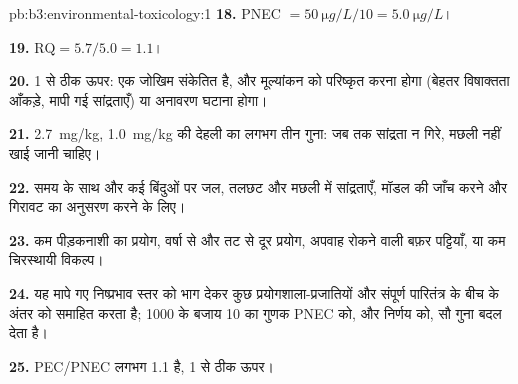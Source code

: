 \begin{solution}{pb:b3:environmental-toxicology:1}
\textbf{18.} PNEC $= \qty{50}{\micro g/L}/10 = \qty{5.0}{\micro g/L}$।

\textbf{19.} $\mathrm{RQ} = 5.7/5.0 = 1.1$।

\textbf{20.} 1 से ठीक ऊपर: एक जोखिम संकेतित है, और मूल्यांकन को परिष्कृत करना होगा (बेहतर
विषाक्तता आँकड़े, मापी गई सांद्रताएँ) या अनावरण घटाना होगा।

\textbf{21.} \qty{2.7}{mg/kg}, \qty{1.0}{mg/kg} की देहली का लगभग तीन गुना: जब तक सांद्रता न गिरे,
मछली नहीं खाई जानी चाहिए।

\textbf{22.} समय के साथ और कई बिंदुओं पर जल, तलछट और मछली में सांद्रताएँ,
मॉडल की जाँच करने और गिरावट का अनुसरण करने के लिए।

\textbf{23.} कम पीड़कनाशी का प्रयोग, वर्षा से और तट से दूर प्रयोग,
अपवाह रोकने वाली बफ़र पट्टियाँ, या कम चिरस्थायी विकल्प।

\textbf{24.} यह मापे गए निष्प्रभाव स्तर को भाग देकर कुछ प्रयोगशाला-प्रजातियों और
संपूर्ण पारितंत्र के बीच के अंतर को समाहित करता है; 1000 के बजाय 10 का गुणक
PNEC को, और निर्णय को, सौ गुना बदल देता है।

\textbf{25.}  PEC/PNEC लगभग 1.1 है, 1 से ठीक ऊपर।
\end{solution}
